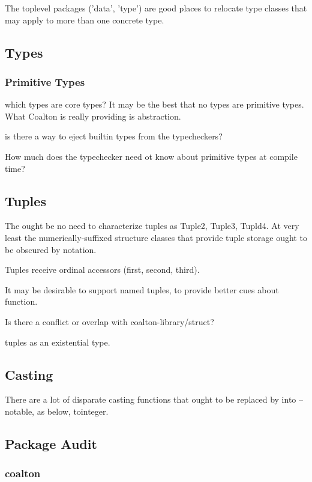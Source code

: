 \documentclass[12pt]{article}
\begin{document}
The toplevel packages ('data', 'type') are good places to relocate
type classes that may apply to more than one concrete type.

\subsection{Types}

\subsubsection{Primitive Types}

which types are core types? It may be the best that no types are
primitive types. What Coalton is really providing is abstraction.

is there a way to eject builtin types from the typecheckers?

How much does the typechecker need ot know about primitive types at compile time?

\subsection{Tuples}

The ought be no need to characterize tuples as Tuple2, Tuple3,
Tupld4. At very least the numerically-suffixed structure classes that
provide tuple storage ought to be obscured by notation.

Tuples receive ordinal accessors (first, second, third).

It may be desirable to support named tuples, to provide better cues
about function.

Is there a conflict or overlap with coalton-library/struct?

tuples as an existential type.

\subsection{Casting}

There are a lot of disparate casting functions that ought to be
replaced by into -- notable, as below, tointeger.

\subsection{Package Audit}

\subsubsection{coalton}
\end{document}
